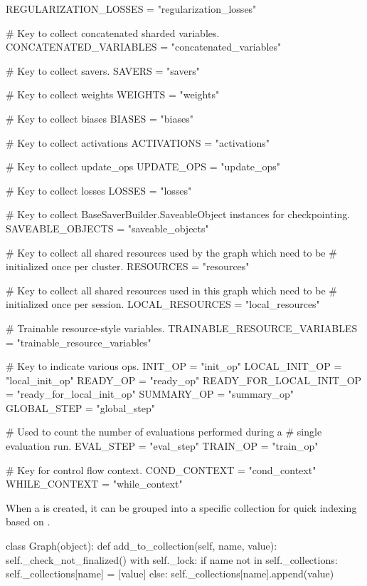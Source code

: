 \begin{content}
\begin{leftbar}
\begin{python}
  REGULARIZATION_LOSSES = "regularization_losses"

  # Key to collect concatenated sharded variables.
  CONCATENATED_VARIABLES = "concatenated_variables"

  # Key to collect savers.
  SAVERS = "savers"

  # Key to collect weights
  WEIGHTS = "weights"

  # Key to collect biases
  BIASES = "biases"

  # Key to collect activations
  ACTIVATIONS = "activations"

  # Key to collect update\_ops
  UPDATE_OPS = "update_ops"

  # Key to collect losses
  LOSSES = "losses"

  # Key to collect BaseSaverBuilder.SaveableObject instances for checkpointing.
  SAVEABLE_OBJECTS = "saveable_objects"

  # Key to collect all shared resources used by the graph which need to be
  # initialized once per cluster.
  RESOURCES = "resources"

  # Key to collect all shared resources used in this graph which need to be
  # initialized once per session.
  LOCAL_RESOURCES = "local_resources"

  # Trainable resource-style variables.
  TRAINABLE_RESOURCE_VARIABLES = "trainable_resource_variables"

  # Key to indicate various ops.
  INIT_OP = "init_op"
  LOCAL_INIT_OP = "local_init_op"
  READY_OP = "ready_op"
  READY_FOR_LOCAL_INIT_OP = "ready_for_local_init_op"
  SUMMARY_OP = "summary_op"
  GLOBAL_STEP = "global_step"

  # Used to count the number of evaluations performed during a 
  # single evaluation run.
  EVAL_STEP = "eval_step"
  TRAIN_OP = "train_op"

  # Key for control flow context.
  COND_CONTEXT = "cond_context"
  WHILE_CONTEXT = "while_context"
\end{python}
\end{leftbar}

When a  is created, it can be grouped into a specific collection for quick indexing based on .

\begin{leftbar}
\begin{python}
class Graph(object):
  def add_to_collection(self, name, value):
    self._check_not_finalized()
    with self._lock:
      if name not in self._collections:
        self._collections[name] = [value]
      else:
        self._collections[name].append(value)
\end{python}
\end{leftbar}



\end{content}
